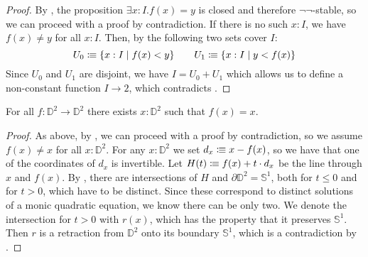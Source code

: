 \begin{proof}
  By , the proposition $\exists x:I.f(x)=y$ is closed and therefore $\neg\neg$-stable, so we can proceed with a proof by contradiction.
  If there is no such $x:I$, we have $f(x)\neq y$ for all $x:I$.
  Then, by  the following two sets cover $I$:
  \[
    U_0\vcentcolon\mspace{-1.2mu}\equiv \{x:I\mid f(x)<y\} \quad\quad
    U_1\vcentcolon\mspace{-1.2mu}\equiv \{x:I\mid y<f(x)\}
    \]
  Since $U_0$ and $U_1$ are disjoint, we have $I=U_0+U_1$ which allows us to define a non-constant function $I\to 2$, which contradicts .
\end{proof}

\begin{theorem}
  For all $f:\mathbb{D}^2\to \mathbb{D}^2$ there exists $x:\mathbb{D}^2$ such that $f(x)=x$.
\end{theorem}

\begin{proof}
  As above, by , we can proceed with a proof by contradiction,
  so we assume $f(x)\neq x$ for all $x:\mathbb{D}^2$.
  For any $x:\mathbb{D}^2$ we set $d_x\vcentcolon\mspace{-1.2mu}\equiv x-f(x)$, so we have that one of the coordinates of $d_x$ is invertible.
  Let $H(t)\vcentcolon\mspace{-1.2mu}\equiv f(x) + t\cdot d_x $ be the line through $x$ and $f(x)$.
  By , there are intersections of $H$ and $\partial\mathbb{D}^2=\mathbb{S}^1$, both for $t\leq 0$ and for $t> 0$, which have to be distinct.
  Since these correspond to distinct solutions of a monic quadratic equation, we know there can be only two.
  We denote the intersection for $t> 0$ with $r(x)$, which has the property that it preserves $\mathbb{S}^1$.
  Then $r$ is a retraction from $\mathbb{D}^2$ onto its boundary $\mathbb{S}^1$, which is a contradiction by .
\end{proof}

